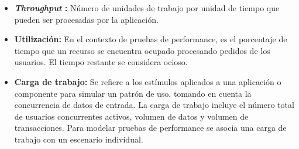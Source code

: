\begin{itemize}
	\item \textbf{\emph{Throughput} :} Número de unidades de trabajo por unidad de tiempo que pueden ser procesadas por la aplicación.
	\item \textbf{Utilización:} En el contexto de pruebas de performance, es el porcentaje de tiempo que un recurso se encuentra ocupado procesando pedidos de los usuarios. El tiempo restante se considera ocioso.
	\item \textbf{Carga de trabajo:} Se refiere a los estímulos aplicados a una aplicación o componente para simular un patrón de uso, tomando en cuenta la concurrencia de datos de entrada. La carga de trabajo incluye el número total de usuarios concurrentes activos, volumen de datos y volumen de transacciones. Para modelar pruebas de performance se asocia una carga de trabajo con un escenario individual.
\end{itemize}

